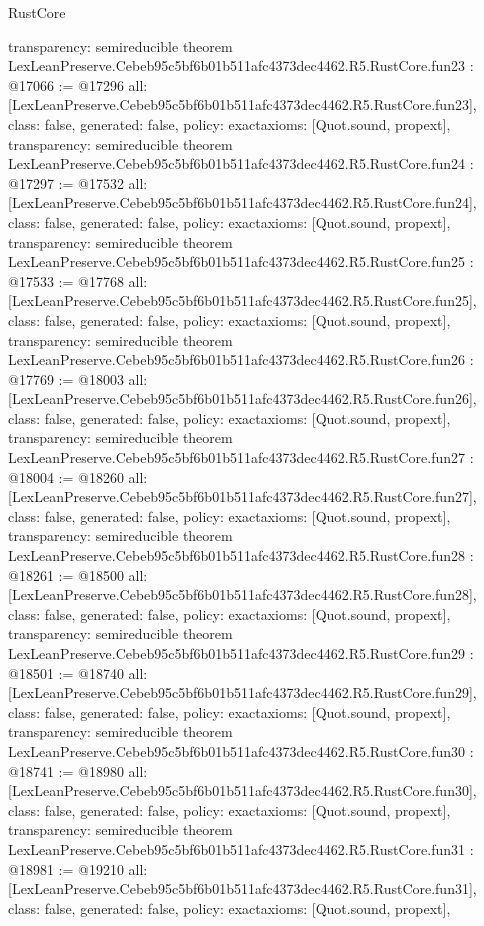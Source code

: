 \begin{lexlean}{RustCore}
\begin{coremodule}
{  transparency: semireducible
}
theorem LexLeanPreserve.Cebeb95c5bf6b01b511afc4373dec4462.R5.RustCore.fun23 : @17066 := @17296 {
  all: [LexLeanPreserve.Cebeb95c5bf6b01b511afc4373dec4462.R5.RustCore.fun23],
  class: false,
  generated: false,
  policy: exact{axioms: [Quot.sound, propext]},
  transparency: semireducible
}
theorem LexLeanPreserve.Cebeb95c5bf6b01b511afc4373dec4462.R5.RustCore.fun24 : @17297 := @17532 {
  all: [LexLeanPreserve.Cebeb95c5bf6b01b511afc4373dec4462.R5.RustCore.fun24],
  class: false,
  generated: false,
  policy: exact{axioms: [Quot.sound, propext]},
  transparency: semireducible
}
theorem LexLeanPreserve.Cebeb95c5bf6b01b511afc4373dec4462.R5.RustCore.fun25 : @17533 := @17768 {
  all: [LexLeanPreserve.Cebeb95c5bf6b01b511afc4373dec4462.R5.RustCore.fun25],
  class: false,
  generated: false,
  policy: exact{axioms: [Quot.sound, propext]},
  transparency: semireducible
}
theorem LexLeanPreserve.Cebeb95c5bf6b01b511afc4373dec4462.R5.RustCore.fun26 : @17769 := @18003 {
  all: [LexLeanPreserve.Cebeb95c5bf6b01b511afc4373dec4462.R5.RustCore.fun26],
  class: false,
  generated: false,
  policy: exact{axioms: [Quot.sound, propext]},
  transparency: semireducible
}
theorem LexLeanPreserve.Cebeb95c5bf6b01b511afc4373dec4462.R5.RustCore.fun27 : @18004 := @18260 {
  all: [LexLeanPreserve.Cebeb95c5bf6b01b511afc4373dec4462.R5.RustCore.fun27],
  class: false,
  generated: false,
  policy: exact{axioms: [Quot.sound, propext]},
  transparency: semireducible
}
theorem LexLeanPreserve.Cebeb95c5bf6b01b511afc4373dec4462.R5.RustCore.fun28 : @18261 := @18500 {
  all: [LexLeanPreserve.Cebeb95c5bf6b01b511afc4373dec4462.R5.RustCore.fun28],
  class: false,
  generated: false,
  policy: exact{axioms: [Quot.sound, propext]},
  transparency: semireducible
}
theorem LexLeanPreserve.Cebeb95c5bf6b01b511afc4373dec4462.R5.RustCore.fun29 : @18501 := @18740 {
  all: [LexLeanPreserve.Cebeb95c5bf6b01b511afc4373dec4462.R5.RustCore.fun29],
  class: false,
  generated: false,
  policy: exact{axioms: [Quot.sound, propext]},
  transparency: semireducible
}
theorem LexLeanPreserve.Cebeb95c5bf6b01b511afc4373dec4462.R5.RustCore.fun30 : @18741 := @18980 {
  all: [LexLeanPreserve.Cebeb95c5bf6b01b511afc4373dec4462.R5.RustCore.fun30],
  class: false,
  generated: false,
  policy: exact{axioms: [Quot.sound, propext]},
  transparency: semireducible
}
theorem LexLeanPreserve.Cebeb95c5bf6b01b511afc4373dec4462.R5.RustCore.fun31 : @18981 := @19210 {
  all: [LexLeanPreserve.Cebeb95c5bf6b01b511afc4373dec4462.R5.RustCore.fun31],
  class: false,
  generated: false,
  policy: exact{axioms: [Quot.sound, propext]},
}
\end{coremodule}
\end{lexlean}
